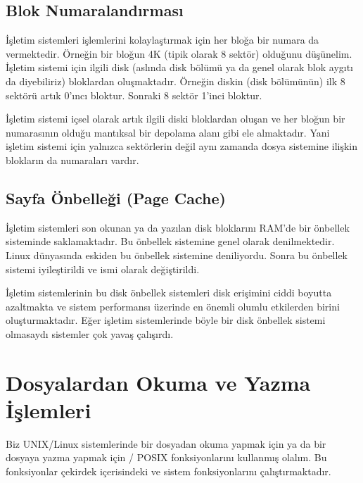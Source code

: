 \documentclass[a4paper,10pt,turkish]{sphinxmanual}
\begin{document}
\subsection{Blok Numaralandırması}
\label{\detokenize{filesystem1:blok-numaralandirmasi}}
\sphinxAtStartPar
İşletim sistemleri işlemlerini kolaylaştırmak için her bloğa bir numara da vermektedir. Örneğin
bir bloğun 4K (tipik olarak 8 sektör) olduğunu düşünelim. İşletim sistemi için ilgili disk (aslında
disk bölümü ya da genel olarak blok aygıtı da diyebiliriz) bloklardan oluşmaktadır. Örneğin
diskin (disk bölümünün) ilk 8 sektörü artık 0’ıncı bloktur. Sonraki 8 sektör 1’inci bloktur.

\sphinxAtStartPar
İşletim sistemi içsel olarak artık ilgili diski bloklardan oluşan ve her bloğun bir numarasının
olduğu mantıksal bir depolama alanı gibi ele almaktadır. Yani işletim sistemi için yalnızca
sektörlerin değil aynı zamanda dosya sistemine ilişkin blokların da numaraları vardır.


\subsection{Sayfa Önbelleği (Page Cache)}
\label{\detokenize{filesystem1:sayfa-onbellegi-page-cache}}
\sphinxAtStartPar
İşletim sistemleri son okunan ya da yazılan disk bloklarını RAM’de bir önbellek sisteminde
saklamaktadır. Bu önbellek sistemine genel olarak 
denilmektedir. Linux dünyasında eskiden bu önbellek sistemine  deniliyordu. Sonra
bu önbellek sistemi iyileştirildi ve ismi  olarak değiştirildi.

\sphinxAtStartPar
İşletim sistemlerinin bu disk önbellek sistemleri disk erişimini ciddi boyutta azaltmakta ve
sistem performansı üzerinde en önemli olumlu etkilerden birini oluşturmaktadır. Eğer işletim
sistemlerinde böyle bir disk önbellek sistemi olmasaydı sistemler çok yavaş çalışırdı.


\section{Dosyalardan Okuma ve Yazma İşlemleri}
\label{\detokenize{filesystem1:dosyalardan-okuma-ve-yazma-islemleri}}
\sphinxAtStartPar
Biz UNIX/Linux sistemlerinde bir dosyadan okuma yapmak için ya da bir dosyaya yazma yapmak için
/ POSIX fonksiyonlarını kullanmış olalım. Bu fonksiyonlar çekirdek içerisindeki
 ve  sistem fonksiyonlarını çalıştırmaktadır.
\end{document}
